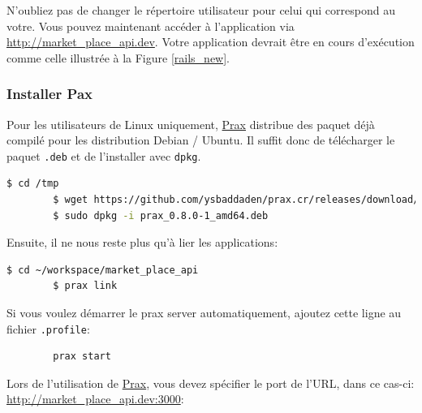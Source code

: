 \documentclass[]{report}
\begin{document}
        N'oubliez pas de changer le répertoire utilisateur pour celui qui correspond au votre. Vous pouvez maintenant accéder à l'application via \href{http://market_place_api.dev/}{http://market\_place\_api.dev}. Votre application devrait être en cours d'exécution comme celle illustrée à la Figure \ref{rails_new}.

      \subsubsection{Installer Pax}

        Pour les utilisateurs de Linux uniquement, \href{https://github.com/ysbaddaden/prax.cr}{Prax} distribue des paquet déjà compilé pour les distribution Debian / Ubuntu. Il suffit donc de télécharger le paquet \verb|.deb| et de l'installer avec \verb|dpkg|.

        \begin{scriptsize}
        \begin{lstlisting}[language=bash, breaklines]
        $ cd /tmp
        $ wget https://github.com/ysbaddaden/prax.cr/releases/download/v0.8.0/prax_0.8.0-1_amd64.deb
        $ sudo dpkg -i prax_0.8.0-1_amd64.deb
        \end{lstlisting}
        \end{scriptsize}

        Ensuite, il ne nous reste plus qu'à lier les applications:

        \begin{scriptsize}
        \begin{lstlisting}[language=bash]
        $ cd ~/workspace/market_place_api
        $ prax link
        \end{lstlisting}
        \end{scriptsize}

        Si vous voulez démarrer le prax server automatiquement, ajoutez cette ligne au fichier \verb|.profile|:

        \begin{scriptsize}
        \begin{lstlisting}
        prax start
        \end{lstlisting}
        \end{scriptsize}

        Lors de l'utilisation de \href{https://github.com/ysbaddaden/prax.cr}{Prax}, vous devez spécifier le port de l'URL, dans ce cas-ci: \href{http://market_place_api.dev:3000/}{http://market\_place\_api.dev:3000}:
\end{document}
